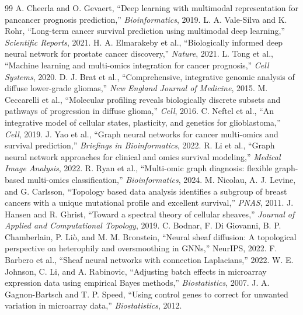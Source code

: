 \documentclass[conference]{IEEEtran}
\begin{document}
\clearpage
\begin{thebibliography}{99}
 A. Cheerla and O. Gevaert, ``Deep learning with multimodal representation for pancancer prognosis prediction,'' \emph{Bioinformatics}, 2019.
 L. A. Vale-Silva and K. Rohr, ``Long-term cancer survival prediction using multimodal deep learning,'' \emph{Scientific Reports}, 2021.
 H. A. Elmarakeby et al., ``Biologically informed deep neural network for prostate cancer discovery,'' \emph{Nature}, 2021.
 L. Tong et al., ``Machine learning and multi-omics integration for cancer prognosis,'' \emph{Cell Systems}, 2020.
 D. J. Brat et al., ``Comprehensive, integrative genomic analysis of diffuse lower-grade gliomas,'' \emph{New England Journal of Medicine}, 2015.
 M. Ceccarelli et al., ``Molecular profiling reveals biologically discrete subsets and pathways of progression in diffuse glioma,'' \emph{Cell}, 2016.
 C. Neftel et al., ``An integrative model of cellular states, plasticity, and genetics for glioblastoma,'' \emph{Cell}, 2019.
 J. Yao et al., ``Graph neural networks for cancer multi-omics and survival prediction,'' \emph{Briefings in Bioinformatics}, 2022.
 R. Li et al., ``Graph neural network approaches for clinical and omics survival modeling,'' \emph{Medical Image Analysis}, 2022.
 R. Ryan et al., ``Multi-omic graph diagnosis: flexible graph-based multi-omics classification,'' \emph{Bioinformatics}, 2024.
 M. Nicolau, A. J. Levine, and G. Carlsson, ``Topology based data analysis identifies a subgroup of breast cancers with a unique mutational profile and excellent survival,'' \emph{PNAS}, 2011.
 J. Hansen and R. Ghrist, ``Toward a spectral theory of cellular sheaves,'' \emph{Journal of Applied and Computational Topology}, 2019.
 C. Bodnar, F. Di Giovanni, B. P. Chamberlain, P. Li\`o, and M. M. Bronstein, ``Neural sheaf diffusion: A topological perspective on heterophily and oversmoothing in GNNs,'' NeurIPS, 2022.
 F. Barbero et al., ``Sheaf neural networks with connection Laplacians,'' 2022.
 W. E. Johnson, C. Li, and A. Rabinovic, ``Adjusting batch effects in microarray expression data using empirical Bayes methods,'' \emph{Biostatistics}, 2007.
 J. A. Gagnon-Bartsch and T. P. Speed, ``Using control genes to correct for unwanted variation in microarray data,'' \emph{Biostatistics}, 2012.

\end{thebibliography}
\end{document}
